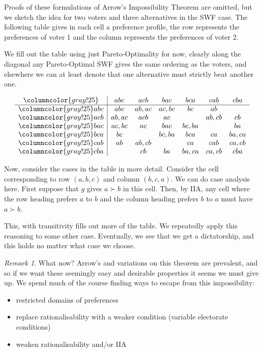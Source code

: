 \documentclass{book}
\theoremstyle{plain}
\theoremstyle{definition}
\theoremstyle{remark}
\newtheorem{remark}[theorem]{Remark}
\begin{document}
Proofs of these formulations of 
Arrow's Impossibility Theorem are omitted, but we sketch the idea
for two voters and three alternatives in the SWF case.
The following table gives in each cell a preference profile, 
the row represents the 
preferences of voter 1 and the column represents the preferences of voter 2.

We fill out the table using just Pareto-Optimality for now, 
clearly along the diagonal any Pareto-Optimal SWF
gives the same ordering as the voters,
and elsewhere we can at least denote that 
one alternative must strictly beat another one.



\[
\begin{array}{>{\columncolor{gray!25}}c|*{6}{>{\centering\arraybackslash}c}}
    & abc & acb & bac & bca & cab & cba \\ \hline
abc & abc & ab, ac & ac, bc & bc & ab &  \\
acb & ab, ac & acb & ac &  & ab, cb & cb \\
bac & ac, bc & ac & bac & bc, ba &  & ba \\
bca & bc &  & bc, ba & bca & ca & ba, ca \\
cab & ab & ab, cb &  & ca & cab & ca, cb \\
cba &  & cb & ba & ba, ca & ca, cb & cba
\end{array}
\]

Now, consider the cases in the table in more detail.
Consider the 
cell corresponding to 
row $(a, b, c)$ and 
column $(b, c, a)$.
We can do case analysis here.
First suppose that 
$g$ gives $a \succ b$ in this cell.
Then, by IIA, any cell 
where the row heading prefers 
$a$ to $b$ and the column heading prefers $b$ to $a$ must have $a \succ b$.

This, with transitivity fills out more of the table.
We repeatedly apply this reasoning to some other case.
Eventually, we see that we get a 
dictatorship, and this holds no matter what case we choose.


\begin{remark}
    What now? 
    Arrow's and variations 
    on this theorem are prevalent, 
    and so if we want these seemingly easy and desirable properties
    it seems we must give up.
    We spend much of the course finding ways to escape from this 
    impossibility:
    \begin{itemize}
        \item restricted domains of preferences
        \item replace rationalisability with a weaker condition (variable electorate conditions)
        \item weaken rationalisability and/or IIA
    \end{itemize}
\end{remark}
\end{document}
